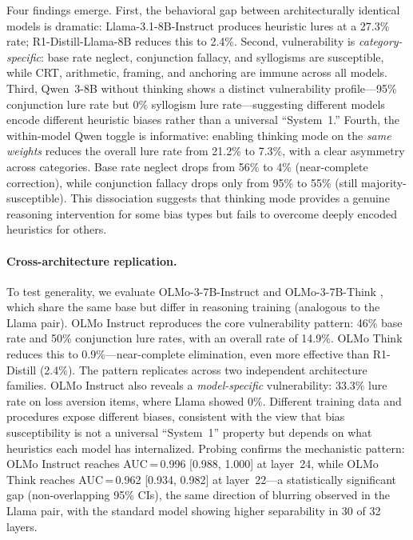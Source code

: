 \documentclass[twocolumn,10pt]{article}
\begin{document}
Four findings emerge.  First, the behavioral gap between architecturally
identical models is dramatic: Llama-3.1-8B-Instruct produces heuristic
lures at a 27.3\% rate; R1-Distill-Llama-8B reduces this to 2.4\%.
Second, vulnerability is \emph{category-specific}: base rate neglect,
conjunction fallacy, and syllogisms are susceptible, while CRT,
arithmetic, framing, and anchoring are immune across all models.  Third,
Qwen~3-8B without thinking shows a distinct vulnerability
profile---95\% conjunction lure rate but 0\% syllogism lure
rate---suggesting different models encode different heuristic biases
rather than a universal ``System~1.''  Fourth, the within-model Qwen
toggle is informative: enabling thinking mode on the \emph{same weights}
reduces the overall lure rate from 21.2\% to 7.3\%, with a clear
asymmetry across categories.  Base rate neglect drops from 56\% to 4\%
(near-complete correction), while conjunction fallacy drops only from
95\% to 55\% (still majority-susceptible).  This dissociation suggests
that thinking mode provides a genuine reasoning intervention for some
bias types but fails to overcome deeply encoded heuristics for others.

\paragraph{Cross-architecture replication.}
To test generality, we evaluate OLMo-3-7B-Instruct and
OLMo-3-7B-Think \citep{olmo3}, which share the same base but differ in
reasoning training (analogous to the Llama pair).  OLMo Instruct
reproduces the core vulnerability pattern: 46\% base rate and 50\%
conjunction lure rates, with an overall rate of 14.9\%.  OLMo Think
reduces this to 0.9\%---near-complete elimination, even more effective
than R1-Distill (2.4\%).  The pattern replicates across two independent
architecture families.  OLMo Instruct also reveals a
\emph{model-specific} vulnerability: 33.3\% lure rate on loss aversion
items, where Llama showed 0\%.  Different training data and procedures
expose different biases, consistent with the view that bias
susceptibility is not a universal ``System~1'' property but depends on
what heuristics each model has internalized.  Probing confirms the mechanistic pattern: OLMo Instruct reaches AUC\,=\,0.996 [0.988, 1.000] at layer~24, while OLMo Think reaches AUC\,=\,0.962 [0.934, 0.982] at layer~22---a statistically significant gap (non-overlapping 95\% CIs), the same direction of blurring observed in the Llama pair, with the standard model showing higher separability in 30 of 32 layers.
\end{document}
